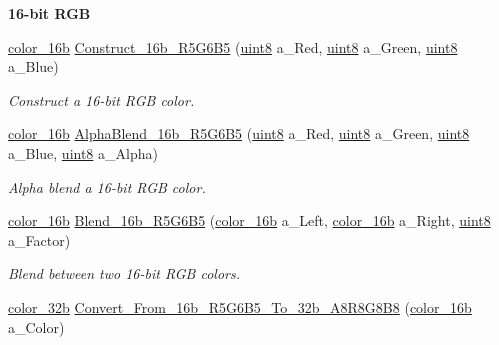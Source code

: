 \begin{Indent}{\bf 16-\/bit RGB}\par
\begin{DoxyCompactItemize}
\item 
\hyperlink{namespacetil_a952afde951048a62d0f970dc6ca89a45}{color\_\-16b} \hyperlink{namespacetil_a7e42efe1f69a94e67190c1434fd002f4}{Construct\_\-16b\_\-R5G6B5} (\hyperlink{namespacetil_a7a75b0e7e2cd3f19ea51c8c02fd242f8}{uint8} a\_\-Red, \hyperlink{namespacetil_a7a75b0e7e2cd3f19ea51c8c02fd242f8}{uint8} a\_\-Green, \hyperlink{namespacetil_a7a75b0e7e2cd3f19ea51c8c02fd242f8}{uint8} a\_\-Blue)
\begin{DoxyCompactList}\small\item\em Construct a 16-\/bit RGB color. \item\end{DoxyCompactList}\item 
\hyperlink{namespacetil_a952afde951048a62d0f970dc6ca89a45}{color\_\-16b} \hyperlink{namespacetil_aa272abfc1060298455205cfe08c95e37}{AlphaBlend\_\-16b\_\-R5G6B5} (\hyperlink{namespacetil_a7a75b0e7e2cd3f19ea51c8c02fd242f8}{uint8} a\_\-Red, \hyperlink{namespacetil_a7a75b0e7e2cd3f19ea51c8c02fd242f8}{uint8} a\_\-Green, \hyperlink{namespacetil_a7a75b0e7e2cd3f19ea51c8c02fd242f8}{uint8} a\_\-Blue, \hyperlink{namespacetil_a7a75b0e7e2cd3f19ea51c8c02fd242f8}{uint8} a\_\-Alpha)
\begin{DoxyCompactList}\small\item\em Alpha blend a 16-\/bit RGB color. \item\end{DoxyCompactList}\item 
\hyperlink{namespacetil_a952afde951048a62d0f970dc6ca89a45}{color\_\-16b} \hyperlink{namespacetil_a1644b5f4cb28c7d3bc752873b66d3f58}{Blend\_\-16b\_\-R5G6B5} (\hyperlink{namespacetil_a952afde951048a62d0f970dc6ca89a45}{color\_\-16b} a\_\-Left, \hyperlink{namespacetil_a952afde951048a62d0f970dc6ca89a45}{color\_\-16b} a\_\-Right, \hyperlink{namespacetil_a7a75b0e7e2cd3f19ea51c8c02fd242f8}{uint8} a\_\-Factor)
\begin{DoxyCompactList}\small\item\em Blend between two 16-\/bit RGB colors. \item\end{DoxyCompactList}\item 
\hyperlink{namespacetil_a8eb2d871b8a6ffb55b3eeb720207a6cb}{color\_\-32b} \hyperlink{namespacetil_a2c7206c211d1a546b6ceb3e1170efd54}{Convert\_\-From\_\-16b\_\-R5G6B5\_\-To\_\-32b\_\-A8R8G8B8} (\hyperlink{namespacetil_a952afde951048a62d0f970dc6ca89a45}{color\_\-16b} a\_\-Color)

\end{DoxyCompactItemize}
\end{Indent}
